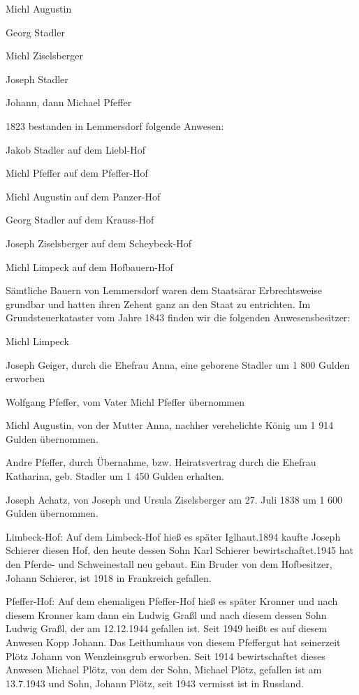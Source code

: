 Michl Augustin

Georg Stadler

Michl Ziselsberger

Joseph Stadler

Johann, dann Michael Pfeffer



1823 bestanden in Lemmersdorf folgende Anwesen:



Jakob Stadler auf dem Liebl-Hof

Michl Pfeffer auf dem Pfeffer-Hof

Michl Augustin auf dem Panzer-Hof

Georg Stadler auf dem Krauss-Hof

Joseph Ziselsberger auf dem Scheybeck-Hof

Michl Limpeck auf dem Hofbauern-Hof



Sämtliche Bauern von Lemmersdorf waren dem Staatsärar Erbrechtsweise grundbar
und hatten ihren Zehent ganz an den Staat zu entrichten. Im Grundsteuerkataster
vom Jahre 1843 finden wir die folgenden Anwesensbesitzer:



Michl Limpeck

Joseph Geiger, durch die Ehefrau Anna, eine geborene Stadler um 1 800 Gulden
erworben

Wolfgang Pfeffer, vom Vater Michl Pfeffer übernommen

Michl Augustin, von der Mutter Anna, nachher verehelichte König um 1 914 Gulden
übernommen.

Andre Pfeffer, durch Übernahme, bzw. Heiratsvertrag durch die Ehefrau Katharina,
geb. Stadler um 1 450 Gulden erhalten.

Joseph Achatz, von Joseph und Ursula Ziselsberger am 27. Juli 1838 um 1 600
Gulden übernommen.



Limbeck-Hof: Auf dem Limbeck-Hof hieß es später Iglhaut.1894 kaufte Joseph
Schierer diesen Hof, den heute dessen Sohn Karl Schierer bewirtschaftet.1945 hat
den Pferde- und Schweinestall neu gebaut. Ein Bruder von dem Hofbesitzer, Johann
Schierer, ist 1918 in Frankreich gefallen.

Pfeffer-Hof: Auf dem ehemaligen Pfeffer-Hof hieß es später Kronner und nach
diesem Kronner kam dann ein Ludwig Graßl und nach diesem dessen Sohn Ludwig
Graßl, der am 12.12.1944 gefallen ist. Seit 1949 heißt es auf diesem Anwesen
Kopp Johann. Das Leithumhaus von diesem Pfeffergut hat seinerzeit Plötz Johann
von Wenzleinsgrub erworben. Seit 1914 bewirtschaftet dieses Anwesen Michael
Plötz, von dem der Sohn, Michael Plötz, gefallen ist am 13.7.1943 und Sohn,
Johann Plötz, seit 1943 vermisst ist in Russland.


